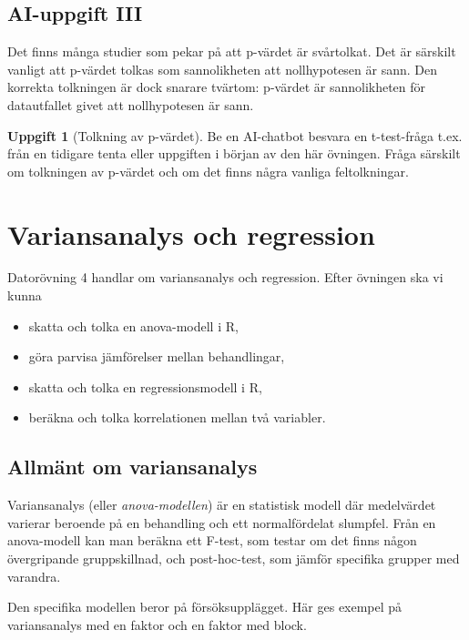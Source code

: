 \documentclass[
]{book}
\providecommand{\tightlist}{%
  \setlength{\itemsep}{0pt}\setlength{\parskip}{0pt}}
\theoremstyle{definition}
\theoremstyle{definition}
\theoremstyle{definition}
\newtheorem{exercise}{Uppgift}[chapter]
\theoremstyle{definition}
\theoremstyle{remark}
\begin{document}
\section{AI-uppgift III}\label{ai-uppgift-iii}

Det finns många studier som pekar på att p-värdet är svårtolkat. Det är särskilt vanligt att p-värdet tolkas som sannolikheten att nollhypotesen är sann. Den korrekta tolkningen är dock snarare tvärtom: p-värdet är sannolikheten för datautfallet givet att nollhypotesen är sann.

\begin{exercise}[Tolkning av p-värdet]
Be en AI-chatbot besvara en t-test-fråga t.ex. från en tidigare tenta eller uppgiften i början av den här övningen. Fråga särskilt om tolkningen av p-värdet och om det finns några vanliga feltolkningar.
\end{exercise}

\chapter{Variansanalys och regression}\label{variansanalys-och-regression}

Datorövning 4 handlar om variansanalys och regression. Efter övningen ska vi kunna

\begin{itemize}
\tightlist
\item
  skatta och tolka en anova-modell i R,
\item
  göra parvisa jämförelser mellan behandlingar,
\item
  skatta och tolka en regressionsmodell i R,
\item
  beräkna och tolka korrelationen mellan två variabler.
\end{itemize}

\section{Allmänt om variansanalys}\label{allmuxe4nt-om-variansanalys}

Variansanalys (eller \emph{anova-modellen}) är en statistisk modell där medelvärdet varierar beroende på en behandling och ett normalfördelat slumpfel. Från en anova-modell kan man beräkna ett F-test, som testar om det finns någon övergripande gruppskillnad, och post-hoc-test, som jämför specifika grupper med varandra.

Den specifika modellen beror på försöksupplägget. Här ges exempel på variansanalys med en faktor och en faktor med block.
\end{document}
